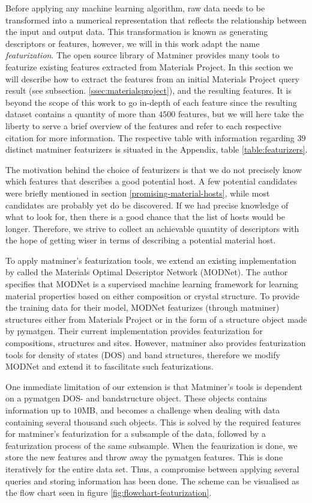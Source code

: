Before applying any machine learning algorithm, raw data needs to be transformed into a numerical representation that reflects the relationship between the input and output data. This transformation is known as generating descriptors or features, however, we will in this work adapt the name \textit{featurization}. The open source library of Matminer provides many tools to featurize existing features extracted from Materials Project. In this section we will describe how to extract the features from an initial Materials Project query result (see subsection. \ref{ssec:materialsproject}), and the resulting features. It is beyond the scope of this work to go in-depth of each feature since the resulting dataset contains a quantity of more than $4500$ features, but we will here take the liberty to serve a brief overview of the features and refer to each respective citation for more information. The respective table with information regarding $39$ distinct matminer featurizers is situated in the Appendix, table \ref{table:featurizers}.

The motivation behind the choice of featurizers is that we do not precisely know which features that describes a good potential host. A few potential candidates were briefly mentioned in section \ref{promising-material-hosts}, while most candidates are probably yet do be discovered. If we  had precise knowledge of what to look for, then there is a good chance that the list of hosts would be longer. Therefore, we strive to collect an achievable quantity of descriptors with the hope of getting wiser in terms of describing a potential material host.

To apply matminer's featurization tools, we extend an existing implementation by \citeauthor{Breuck2021} \cite{Breuck2021} called the Materials Optimal Descriptor Network (MODNet). The author \citeauthor{Breuck2021} specifies that MODNet is a supervised machine learning framework for learning material properties based on either composition or crystal structure. To provide the training data for their model, MODNet featurizes (through matminer) structures either from Materials Project or in the form of a structure object made by pymatgen. Their current implementation provides featurization for compositions, structures and sites. However, matminer also provides featurization tools for density of states (DOS) and band structures, therefore we modify MODNet and extend it to fascilitate such featurizations.

One immediate limitation of our extension is that Matminer's tools is dependent on a pymatgen DOS- and bandstructure object. These objects contains information up to $10$MB, and becomes a challenge when dealing with data containing several thousand such objects. This is solved by the required features for matminer's featurization for a subsample of the data, followed by a featurization process of the same subsample. When the feaurization is done, we store the new features and throw away the pymatgen features. This is done iteratively for the entire data set. Thus, a compromise between applying several queries and storing information has been done. The scheme can be visualised as the flow chart seen in figure \ref{fig:flowchart-featurization}.

